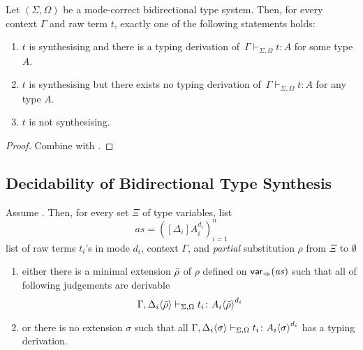 \begin{corollary}
  Let $(\Sigma, \Omega)$ be a mode-correct bidirectional type system.
  Then, for every context $\Gamma$ and raw term $t$, exactly one of the following statements holds:
  \begin{enumerate}
    \item $t$ is synthesising and there is a typing derivation of\, $\Gamma \vdash_{\Sigma, \Omega} t : A$ for some type $A$.
    \item $t$ is synthesising but there exists no typing derivation of\, $\Gamma \vdash_{\Sigma, \Omega} t : A$ for any type $A$.
    \item $t$ is not synthesising.
  \end{enumerate}
\end{corollary}
\begin{proof}
  Combine   with .
  
\end{proof}

\subsection{Decidability of Bidirectional Type Synthesis}

\begin{lemma}\label{lem:args-induction}
  Assume .
  Then, for every set $\Xi$ of type variables, list 
  \[
    \mathit{as} = \left([\Delta_i] A_{i}^{d_i}\right)_{i = 1}^{n}
  \]
  list of raw terms $t_i$'s in mode $d_i$, context $\Gamma$, and \emph{partial} substitution $\rho$ from $\Xi$ to $\emptyset$
  \begin{enumerate}
    \item either there is a minimal extension $\bar{\rho}$ of $\rho$ defined on $\mathsf{var}_{\Rightarrow}(\mathit{as})$ such that all of following judgements are derivable
      \[
        \Gamma, {\Delta_i}\!\left<{\bar{\rho}}\right> \vdash_{\Sigma, \Omega} t_i \colon {A_i}\!\left<{\bar{\rho}}\right>^{d_i}
      \]

    \item or there is no extension $\sigma$ such that all $\Gamma, {\Delta_i}\!\left<{\sigma}\right> \vdash_{\Sigma, \Omega} t_i \colon {A_i}\!\left<{\sigma}\right>^{d_i}$ has a typing derivation. 
  \end{enumerate}
\end{lemma}

